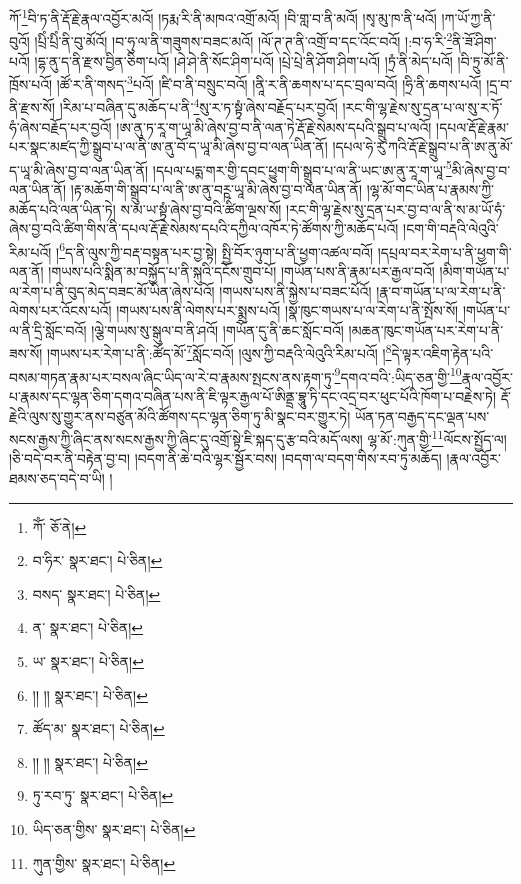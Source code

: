 ཀོ་\footnote{ཀོཾ་  ཅོ་ནེ། }བི་ཏ་ནི་རྡོ་རྗེ་རྣལ་འབྱོར་མའོ། །ཏརྨ་རི་ནི་མཁའ་འགྲོ་མའོ། །བི་གླ་བ་ནི་མའོ། །སྭ་མུ་ཁ་ནི་ཕའོ། །ཀ་ཡོ་ཀྱ་ནི་བུའོ། །པྲིཾ་པྲིཾ་ནི་བུ་མོའོ། །བ་ཧུ་ལ་ནི་གཟུགས་བཟང་མའོ། །ལོ་ཊ་ཊ་ནི་འགྲོ་བ་དང་འོང་བའོ། །:བ་ཧ་རི་\footnote{བ་ཧིར་  སྣར་ཐང་།  པེ་ཅིན། }ནི་ཟོ་ཤིག་པའོ། །དྷ་ནུ་ད་ནི་རྫས་བྱིན་ཅིག་པའོ། །ཤེ་ཤེ་ནི་སོང་ཤིག་པའོ། །པྲེ་པྲེ་ནི་ཤོག་ཤིག་པའོ། །ཏྲཾ་ནི་མེད་པའོ། །བི་ཏྲུ་མོ་ནི་ཁྲོས་པའོ། །ཚོ་ར་ནི་གསད་\footnote{བསད་  སྣར་ཐང་།  པེ་ཅིན། }པའོ། །ཛི་བ་ནི་བསྲུང་བའོ། །ནཱི་ར་ནི་ཆགས་པ་དང་བྲལ་བའོ། །ཧྲི་ནི་ཆགས་པའོ། །དྲ་བ་ནི་རྫས་སོ། །རིམ་པ་བཞིན་དུ་མཆོད་པ་ནི་\footnote{ན་  སྣར་ཐང་།  པེ་ཅིན། }སུ་ར་ཏ་སྟྭཾ་ཞེས་བརྗོད་པར་བྱའོ། །རང་གི་ལྷ་རྗེས་སུ་དྲན་པ་ལ་སུ་ར་ཏོ་ཧཾ་ཞེས་བརྗོད་པར་བྱའོ། །ཨ་ནུ་ཏ་རཱ་ག་ཡཱ་མི་ཞེས་བྱ་བ་ནི་ལན་ཏེ་རྡོ་རྗེ་སེམས་དཔའི་སྒྲུབ་པ་ལའོ། །དཔལ་རྡོ་རྗེ་རྣམ་པར་སྣང་མཛད་ཀྱི་སྒྲུབ་པ་ལ་ནི་ཨ་ནུ་བོ་ད་ཡཱ་མི་ཞེས་བྱ་བ་ལན་ཡིན་ནོ། །དཔལ་ཧེ་རུ་ཀའི་རྡོ་རྗེ་སྒྲུབ་པ་ནི་ཨ་ནུ་མོ་ད་ཡཱ་མི་ཞེས་བྱ་བ་ལན་ཡིན་ནོ། །དཔལ་པདྨ་གར་གྱི་དབང་ཕྱུག་གི་སྒྲུབ་པ་ལ་ནི་ཡང་ཨ་ནུ་རཱ་ག་ཡཱ་\footnote{ཡ་  སྣར་ཐང་།  པེ་ཅིན། }མི་ཞེས་བྱ་བ་ལན་ཡིན་ནོ། །རྟ་མཆོག་གི་སྒྲུབ་པ་ལ་ནི་ཨ་ནུ་བཪྵ་ཡཱ་མི་ཞེས་བྱ་བ་ལན་ཡིན་ནོ། །ལྷ་མོ་གང་ཡིན་པ་རྣམས་ཀྱི་མཆོད་པའི་ལན་ཡིན་ཏེ། ས་མ་ཡ་སྟྭཾ་ཞེས་བྱ་བའི་ཚིག་ལྔས་སོ། །རང་གི་ལྷ་རྗེས་སུ་དྲན་པར་བྱ་བ་ལ་ནི་ས་མ་ཡོ་ཧཾ་ཞེས་བྱ་བའི་ཚིག་གིས་ནི་དཔལ་རྡོ་རྗེ་སེམས་དཔའི་དཀྱིལ་འཁོར་ཏེ་ཚོགས་ཀྱི་མཆོད་པའོ། །ངག་གི་བརྡའི་ལེའུའི་རིམ་པའོ། །\footnote{།། །།  སྣར་ཐང་།  པེ་ཅིན། }ད་ནི་ལུས་ཀྱི་བརྡ་བསྟན་པར་བྱ་སྟེ། སྤྱི་བོར་ཉུག་པ་ནི་ཕྱག་འཚལ་བའོ། །དཔྲལ་བར་རེག་པ་ནི་ཕྱག་གི་ལན་ནོ། །གཡས་པའི་སྨིན་མ་བསྐྱོད་པ་ནི་སྐུའི་དངོས་གྲུབ་པོ། །གཡོན་པས་ནི་རྣམ་པར་རྒྱལ་བའོ། །མིག་གཡོན་པ་ལ་རེག་པ་ནི་བུད་མེད་བཟང་མོ་ཡིན་ཞེས་པའོ། །གཡས་པས་ནི་སྐྱེས་པ་བཟང་པོའོ། །རྣ་བ་གཡོན་པ་ལ་རེག་པ་ནི་ལེགས་པར་འོངས་པའོ། །གཡས་པས་ནི་ལེགས་པར་སྨྲས་པའོ། །སྣ་ཁུང་གཡས་པ་ལ་རེག་པ་ནི་སྤོས་སོ། །གཡོན་པ་ལ་ནི་དྲི་སློང་བའོ། །ལྕེ་གཡས་སུ་སྒུལ་བ་ནི་ཤའོ། །གཡོན་དུ་ནི་ཆང་སློང་བའོ། །མཆན་ཁུང་གཡོན་པར་རེག་པ་ནི་ཟས་སོ། །གཡས་པར་རེག་པ་ནི་:ཚོད་མོ་\footnote{ཚོད་མ་  སྣར་ཐང་།  པེ་ཅིན། }སློང་བའོ། །ལུས་ཀྱི་བརྡའི་ལེའུའི་རིམ་པའོ། །\footnote{།། །།  སྣར་ཐང་།  པེ་ཅིན། }དེ་ལྟར་འཇིག་རྟེན་པའི་བསམ་གཏན་རྣམ་པར་བསལ་ཞིང་ཡིད་ལ་རེ་བ་རྣམས་སྤངས་ནས་རྟག་ཏུ་\footnote{ཏུ་རབ་ཏུ་  སྣར་ཐང་།  པེ་ཅིན། }དགའ་བའི་:ཡིད་ཅན་གྱི་\footnote{ཡིད་ཅན་གྱིས་  སྣར་ཐང་།  པེ་ཅིན། }རྣལ་འབྱོར་པ་རྣམས་དང་ལྷན་ཅིག་དགའ་བཞིན་པས་ནི་ཇི་ལྟར་རྒྱལ་པོ་ཨིནྡྲ་བྷཱུ་ཏི་དང་འདྲ་བར་ཕུང་པོའི་ཁོག་པ་བརྗེས་ཏེ། རྡོ་རྗེའི་ལུས་སུ་གྱུར་ནས་བཙུན་མོའི་ཚོགས་དང་ལྷན་ཅིག་ཏུ་མི་སྣང་བར་གྱུར་ཏེ། ཡོན་ཏན་བརྒྱད་དང་ལྡན་པས་སངས་རྒྱས་ཀྱི་ཞིང་ནས་སངས་རྒྱས་ཀྱི་ཞིང་དུ་འགྲོ་སྟེ་ཇི་སྐད་དུ་རྩ་བའི་མདོ་ལས། ལྷ་མོ་:ཀུན་གྱི་\footnote{ཀུན་གྱིས་  སྣར་ཐང་།  པེ་ཅིན། }ལོངས་སྤྱོད་ལ། །ཅི་བདེ་བར་ནི་བརྟེན་བྱ་བ། །བདག་ནི་ཆེ་བའི་ལྷར་སྦྱོར་བས། །བདག་ལ་བདག་གིས་རབ་ཏུ་མཆོད། །རྣལ་འབྱོར་ཐམས་ཅད་བདེ་བ་ཡི། །
